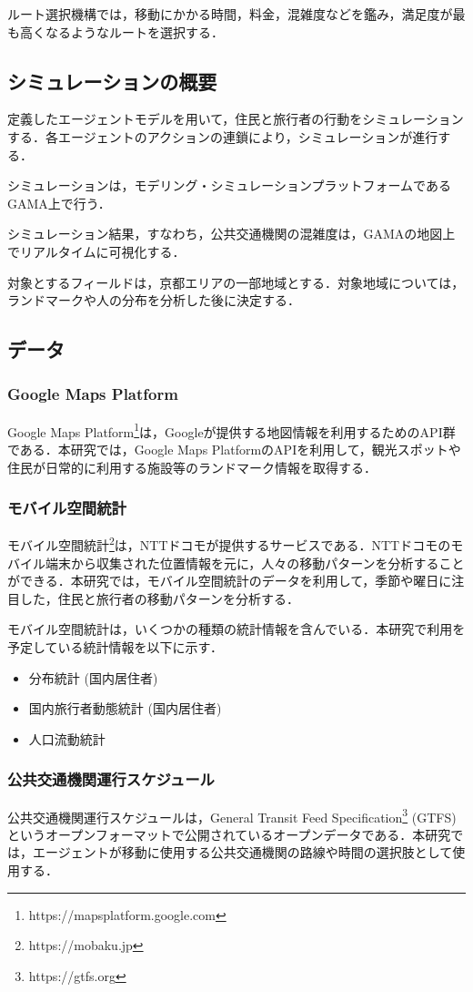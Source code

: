 ルート選択機構では，移動にかかる時間，料金，混雑度などを鑑み，満足度が最も高くなるようなルートを選択する．

\subsection{シミュレーションの概要}
定義したエージェントモデルを用いて，住民と旅行者の行動をシミュレーションする．各エージェントのアクションの連鎖により，シミュレーションが進行する．

シミュレーションは，モデリング・シミュレーションプラットフォームであるGAMA上で行う．

シミュレーション結果，すなわち，公共交通機関の混雑度は，GAMAの地図上でリアルタイムに可視化する．

対象とするフィールドは，京都エリアの一部地域とする．対象地域については，ランドマークや人の分布を分析した後に決定する．

\subsection{データ}
\subsubsection{Google Maps Platform}
Google Maps Platform\footnote{https://mapsplatform.google.com}は，Googleが提供する地図情報を利用するためのAPI群である．本研究では，Google Maps PlatformのAPIを利用して，観光スポットや住民が日常的に利用する施設等のランドマーク情報を取得する．

\subsubsection{モバイル空間統計}
\label{section_mobaku}
モバイル空間統計\footnote{https://mobaku.jp}は，NTTドコモが提供するサービスである．NTTドコモのモバイル端末から収集された位置情報を元に，人々の移動パターンを分析することができる．本研究では，モバイル空間統計のデータを利用して，季節や曜日に注目した，住民と旅行者の移動パターンを分析する．

モバイル空間統計は，いくつかの種類の統計情報を含んでいる．本研究で利用を予定している統計情報を以下に示す．

\begin{itemize}
  \item 分布統計 (国内居住者)
  \item 国内旅行者動態統計 (国内居住者)
  \item 人口流動統計
\end{itemize}

\subsubsection{公共交通機関運行スケジュール}
公共交通機関運行スケジュールは，General Transit Feed Specification\footnote{https://gtfs.org} (GTFS) というオープンフォーマットで公開されているオープンデータである．本研究では，エージェントが移動に使用する公共交通機関の路線や時間の選択肢として使用する．
